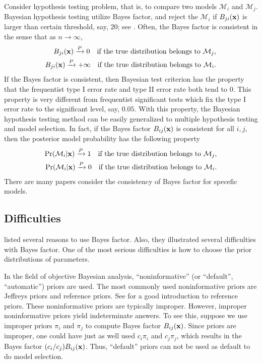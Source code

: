 \documentclass[11pt]{article}
\theoremstyle{plain}
\theoremstyle{definition}
\theoremstyle{remark}
\begin{document}
Consider hypothesis testing problem, that is, to compare two models $\mathcal M_i$ and $\mathcal M_j$.
Bayesian hypothesis testing utilize Bayes factor, and reject the $\mathcal M_i$ if $B_{ji}(\mathbf{x})$ is larger than certain threshold, say, $20$; see \cite{Robert1995Bayes}.
Often, the Bayes factor is consistent in the sense that as $n\to \infty$,
\begin{equation*}
    \begin{split}
        B_{ji}(\mathbf{x})\xrightarrow P  0  \quad \text{if the true distribution belongs to $\mathcal M_j$},\\
        B_{ji}(\mathbf{x})\xrightarrow P  +\infty  \quad \text{if the true distribution belongs to $\mathcal M_i$}.\\
    \end{split}
\end{equation*}
If the Bayes factor is consistent, then Bayesian test criterion has the property that the frequentist type I error rate and type II error rate both tend to $0$.
This property is very different from frequentist significant tests which fix the type I error rate to the significant level, say, $0.05$.
With this property, the Bayesian hypothesis testing method can be easily generalized to multiple hypothesis testing and model selection.
In fact, if the Bayes factor $B_{ij}(\mathbf{x})$ is consistent for all $i,j$, then the posterior model probability has the following property
\begin{equation*}
    \begin{split}
        \Pr(\mathcal M_i |\mathbf{x}) \xrightarrow{P} 1   \quad \text{if the true distribution belongs to $\mathcal M_j$},\\
\Pr(\mathcal M_i |\mathbf{x}) \xrightarrow{P} 0  \quad \text{if the true distribution belongs to $\mathcal M_i$}.\\
    \end{split}
\end{equation*}
There are many papers consider the consistency of Bayes factor for specefic models.

\subsection{Difficulties}
\cite{berger2001Obj} listed several reasons to use Bayes factor.
Also, they illustrated several difficulties with Bayes factor.
One of the most serious difficulties is how to choose the prior distributions of parameters.

In the field of objective Bayesian analysis, ``noninformative'' (or ``default'', ``automatic'') priors are used.
The most commonly used noninformative priors are Jeffreys priors and reference priors.
See \cite{BERNARDO200517} for a good introduction to reference priors.
These noninformative priors are typically improper.
However, improper noninformative priors yield indeterminate answers.
To see this, suppose we use improper priors $\pi_i$ and $\pi_j$ to compute Bayes factor $B_{ij}(\mathbf{x})$.
Since priors are improper, one could have just as well used $c_i \pi_i$ and $c_j \pi_j$, which results in the Bayes factor $(c_i/c_j)B_{ij}(\mathbf{x})$.
Thus, ``default'' priors can not be used as default to do model selection.
\end{document}
